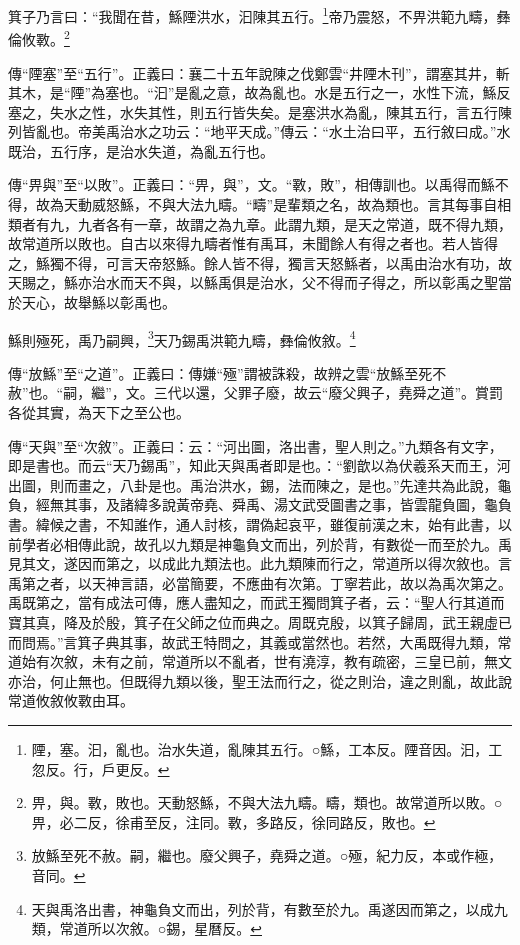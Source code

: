 箕子乃言曰：“我聞在昔，鯀陻洪水，汩陳其五行。\footnote{陻，塞。汩，亂也。治水失道，亂陳其五行。○鯀，工本反。陻音因。汩，工忽反。行，戶更反。}帝乃震怒，不畀洪範九疇，彝倫攸斁。\footnote{畀，與。斁，敗也。天動怒鯀，不與大法九疇。疇，類也。故常道所以敗。○畀，必二反，徐甫至反，注同。斁，多路反，徐同路反，敗也。}


{\noindent\zhuan{}\fzbyks 傳“陻塞”至“五行”。正義曰：襄二十五年說陳之伐鄭雲“井陻木刊”，謂塞其井，斬其木，是“陻”為塞也。“汩”是亂之意，故為亂也。水是五行之一，水性下流，鯀反塞之，失水之性，水失其性，則五行皆失矣。是塞洪水為亂，陳其五行，言五行陳列皆亂也。帝美禹治水之功云：“地平天成。”傳云：“水土治曰平，五行敘曰成。”水既治，五行序，是治水失道，為亂五行也。 \par}

{\noindent\zhuan{}\fzbyks 傳“畀與”至“以敗”。正義曰：“畀，與”，文。“斁，敗”，相傳訓也。以禹得而鯀不得，故為天動威怒鯀，不與大法九疇。“疇”是輩類之名，故為類也。言其每事自相類者有九，九者各有一章，故謂之為九章。此謂九類，是天之常道，既不得九類，故常道所以敗也。自古以來得九疇者惟有禹耳，未聞餘人有得之者也。若人皆得之，鯀獨不得，可言天帝怒鯀。餘人皆不得，獨言天怒鯀者，以禹由治水有功，故天賜之，鯀亦治水而天不與，以鯀禹俱是治水，父不得而子得之，所以彰禹之聖當於天心，故舉鯀以彰禹也。 \par}

鯀則殛死，禹乃嗣興，\footnote{放鯀至死不赦。嗣，繼也。廢父興子，堯舜之道。○殛，紀力反，本或作極，音同。}天乃錫禹洪範九疇，彝倫攸敘。\footnote{天與禹洛出書，神龜負文而出，列於背，有數至於九。禹遂因而第之，以成九類，常道所以次敘。○錫，星曆反。}

{\noindent\zhuan{}\fzbyks 傳“放鯀”至“之道”。正義曰：傳嫌“殛”謂被誅殺，故辨之雲“放鯀至死不赦”也。“嗣，繼”，文。三代以還，父罪子廢，故云“廢父興子，堯舜之道”。賞罰各從其實，為天下之至公也。 \par}

{\noindent\zhuan{}\fzbyks 傳“天與”至“次敘”。正義曰：云：“河出圖，洛出書，聖人則之。”九類各有文字，即是書也。而云“天乃錫禹”，知此天與禹者即是也。：“劉歆以為伏羲系天而王，河出圖，則而畫之，八卦是也。禹治洪水，錫，法而陳之，是也。”先達共為此說，龜負，經無其事，及諸緯多說黃帝堯、舜禹、湯文武受圖書之事，皆雲龍負圖，龜負書。緯候之書，不知誰作，通人討核，謂偽起哀平，雖復前漢之末，始有此書，以前學者必相傳此說，故孔以九類是神龜負文而出，列於背，有數從一而至於九。禹見其文，遂因而第之，以成此九類法也。此九類陳而行之，常道所以得次敘也。言禹第之者，以天神言語，必當簡要，不應曲有次第。丁寧若此，故以為禹次第之。禹既第之，當有成法可傳，應人盡知之，而武王獨問箕子者，云：“聖人行其道而寶其真，降及於殷，箕子在父師之位而典之。周既克殷，以箕子歸周，武王親虛已而問焉。”言箕子典其事，故武王特問之，其義或當然也。若然，大禹既得九類，常道始有次敘，未有之前，常道所以不亂者，世有澆淳，教有疏密，三皇已前，無文亦治，何止無也。但既得九類以後，聖王法而行之，從之則治，違之則亂，故此說常道攸敘攸斁由耳。 \par}

